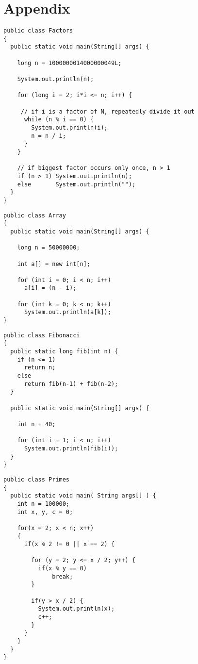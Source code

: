 \chapter{Appendix}

\lstset{
	language=Java,
	basicstyle=\small,
	stringstyle=\ttfamily
}

\begin{lstlisting}[frame=single, title= Factors Benchmark]
public class Factors
{
  public static void main(String[] args) { 

    long n = 1000000014000000049L;
        
    System.out.println(n);

    for (long i = 2; i*i <= n; i++) {

     // if i is a factor of N, repeatedly divide it out
      while (n % i == 0) {
        System.out.println(i); 
        n = n / i;
      }
    }

    // if biggest factor occurs only once, n > 1
    if (n > 1) System.out.println(n);
    else       System.out.println("");
  }
}
\end{lstlisting}

\newpage

\begin{lstlisting}[frame=single, title= Array Benchmark]
public class Array
{	
  public static void main(String[] args) {
		
    long n = 50000000;
		
    int a[] = new int[n];
		
    for (int i = 0; i < n; i++)
      a[i] = (n - i);	
			
    for (int k = 0; k < n; k++)
      System.out.println(a[k]);
}
\end{lstlisting}

\begin{lstlisting}[frame=single, title= Fibonacci Benchmark]
public class Fibonacci
{
  public static long fib(int n) {
    if (n <= 1)
      return n;
    else
      return fib(n-1) + fib(n-2);
  }

  public static void main(String[] args) {
  
    int n = 40;
    
    for (int i = 1; i < n; i++)
      System.out.println(fib(i));
  }
}
\end{lstlisting}

\newpage

\begin{lstlisting}[frame=single, title= Primes Benchmark]
public class Primes
{	
  public static void main( String args[] ) {
    int n = 100000;
    int x, y, c = 0;
    
    for(x = 2; x < n; x++)
    {   
      if(x % 2 != 0 || x == 2) {
      
        for (y = 2; y <= x / 2; y++) {
          if(x % y == 0)
              break;
        }
		
        if(y > x / 2) {
          System.out.println(x);
          c++;
        }
      }
    }
  } 
}
\end{lstlisting}
